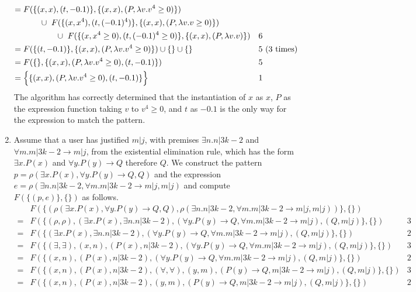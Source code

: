 \documentclass{article}
\begin{document}
\begin{enumerate}
\begin{align*}
		={}	& F(\{	(x,x),(t,-0.1)\},\{(x,x),(P,\lambda v.v^4\geq0)\}) \\
			& \hspace{7mm} \cup ~
			  F(\{	(x,x^4),(t,(-0.1)^4)\},\{(x,x),(P,\lambda v.v\geq0)\}) \\
			& \hspace{14mm} \cup ~
			  F(\{	(x,x^4\geq0),(t,(-0.1)^4\geq0)\},\{(x,x),(P,\lambda v.v)\}) & 6 \\
		={}	& F(\{	(t,-0.1)\},\{(x,x),(P,\lambda v.v^4\geq0)\}) \cup \{\} \cup \{\}
			& 5 & \text{ (3 times)} \\
		={}	& F(\{\},\{(x,x),(P,\lambda v.v^4\geq0),(t,-0.1)\}) & 5 \\
		={}	& \Big\{\{(x,x),(P,\lambda v.v^4\geq0),(t,-0.1)\}\Big\} & 1
		\end{align*}
		The algorithm has correctly determined that the instantiation of $x$ as $x$, $P$ as the expression function taking $v$ to $v^4\geq0$, and $t$ as $-0.1$ is the only way for the expression to match the pattern.
\item	Assume that a user has justified $m|j$, with premises $\exists n.n|3k-2$ and $\forall m.m|3k-2\to m|j$, from the existential elimination rule, which has the form $\exists x.P(x)$ and $\forall y.P(y)\to Q$ therefore $Q$.  We construct the pattern $p=\rho(\exists x.P(x),\forall y.P(y)\to Q,Q)$ and the expression $e=\rho(\exists n.n|3k-2,\forall m.m|3k-2\to m|j,m|j)$ and compute $F(\{(p,e)\},\{\})$ as follows.
		\begin{align*}
			& F(\{(	\rho(\exists x.P(x),\forall y.P(y)\to Q,Q),
					\rho(\exists n.n|3k-2,\forall m.m|3k-2\to m|j,m|j) )\}, \{\}) \\
		={}	& F(\{	(\rho,\rho), (\exists x.P(x),\exists n.n|3k-2),
					(\forall y.P(y)\to Q,\forall m.m|3k-2\to m|j), (Q,m|j) \}, \{\}) & 3 \\
		={}	& F(\{	(\exists x.P(x),\exists n.n|3k-2),
					(\forall y.P(y)\to Q,\forall m.m|3k-2\to m|j), (Q,m|j) \}, \{\}) & 2 \\
		={}	& F(\{	(\exists,\exists), (x,n), (P(x),n|3k-2),
					(\forall y.P(y)\to Q,\forall m.m|3k-2\to m|j), (Q,m|j) \}, \{\}) & 3 \\
		={}	& F(\{	(x,n), (P(x),n|3k-2),
					(\forall y.P(y)\to Q,\forall m.m|3k-2\to m|j), (Q,m|j) \}, \{\}) & 2 \\
		={}	& F(\{	(x,n), (P(x),n|3k-2),
					(\forall,\forall), (y,m), (P(y)\to Q,m|3k-2\to m|j),
					(Q,m|j) \}, \{\}) & 3 \\
		={}	& F(\{	(x,n), (P(x),n|3k-2),
					(y,m), (P(y)\to Q,m|3k-2\to m|j), (Q,m|j) \}, \{\}) & 2 \\

\end{align*}
\end{enumerate}
\end{document}
